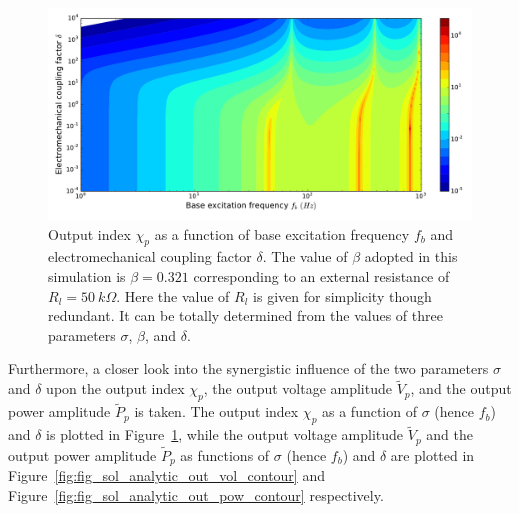 \documentclass{svjour3}                     %
\begin{document}
\begin{figure}[!htbp]
    \centering
    \includegraphics[width=\textwidth]{./img_eig_asy/fig_sol_analytic_out_index_contour}
    \caption{Output index $\chi_p$ as a function of base excitation frequency $f_b$ and electromechanical coupling factor $\delta$. The value of $\beta$ adopted in this simulation is $\beta = 0.321$ corresponding to an external resistance of $R_l = 50\ k\Omega$.  Here the value of $R_l$ is given for simplicity though redundant. It can be totally determined from the values of three parameters $\sigma$, $\beta$, and $\delta$. }
    \label{fig:fig_sol_analytic_out_index_contour}
\end{figure}

Furthermore, a closer look into the synergistic influence of the two parameters $\sigma$ and $\delta$ upon the output index $\chi_p$, the output voltage amplitude $\tilde{V}_p$, and the output power amplitude $\tilde{P}_p$ is taken. The output index $\chi_p$ as a function of $\sigma$ (hence $f_b$) and $\delta$ is plotted in Figure~\ref{fig:fig_sol_analytic_out_index_contour}, while the output voltage amplitude $\tilde{V}_p$ and the output power amplitude $\tilde{P}_p$ as functions of $\sigma$ (hence $f_b$) and $\delta$ are plotted in Figure~\ref{fig:fig_sol_analytic_out_vol_contour} and Figure~\ref{fig:fig_sol_analytic_out_pow_contour} respectively.
\end{document}
